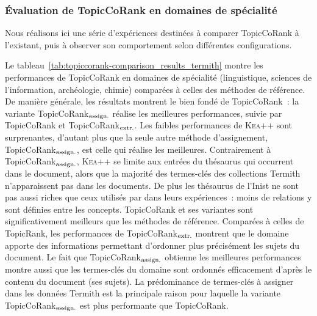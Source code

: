     \subsubsection{Évaluation de TopicCoRank en domaines de spécialité}
    \label{subsubsec:main-domain_specific_keyphrase_annotation-supervised_automatic_keyphrase_annotation-evaluation-topiccorank_specific_domains}
      Nous réalisons ici une série d'expériences destinées à comparer
      TopicCoRank à l'existant, puis à observer son comportement selon
      différentes configurations.

      Le tableau~\ref{tab:topiccorank-comparison_results_termith} montre les
      performances de TopicCoRank en domaines de spécialité (linguistique,
      sciences de l'information, archéologie, chimie) comparées à celles des
      méthodes de référence. De manière générale, les résultats montrent le
      bien fondé de TopicCoRank~: la variante
      TopicCoRank$_\textnormal{assign.}$ réalise les meilleures performances,
      suivie par TopicCoRank et TopicCoRank$_\textnormal{extr.}$. Les faibles
      performances de \textsc{Kea++} sont surprenantes, d'autant plus que la
      seule autre méthode d'assignement, TopicCoRank$_\textnormal{assign.}$,
      est celle qui réalise les meilleures. Contrairement à
      TopicCoRank$_\textnormal{assign.}$, \textsc{Kea++} se limite aux entrées
      du thésaurus qui occurrent dans le document, alors que la majorité des
      termes-clés des collections Termith n'apparaissent pas dans les
      documents. De plus les thésaurus de l'Inist ne sont pas aussi riches que
      ceux utilisés par  dans leurs expériences~:
      moins de relations y sont définies entre les concepts. TopicCoRank et
      ses variantes sont significativement meilleurs que les méthodes de
      référence. Comparées à celles de TopicRank, les performances de
      TopicCoRank$_\textnormal{extr.}$ montrent que le domaine apporte des
      informations permettant d'ordonner plus précisément les sujets du
      document. Le fait que TopicCoRank$_\textnormal{assign.}$ obtienne les
      meilleures performances montre aussi que les termes-clés du domaine sont
      ordonnés efficacement d'après le contenu du document (ses sujets). La
      prédominance de termes-clés à assigner dans les données Termith est la
      principale raison pour laquelle la variante
      TopicCoRank$_\textnormal{assign.}$ est plus performante que TopicCoRank.
